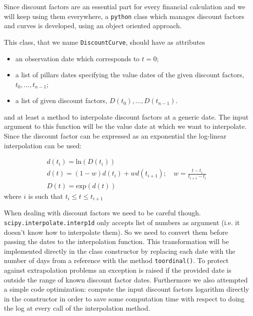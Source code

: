 \begin{finmarkets}
Since discount factors are an essential part for every financial calculation and we will keep using them everywhere, a \texttt{python} class which manages discount factors and curves is developed, using an object oriented approach.

This class, that we name \texttt{DiscountCurve}, should have as attributes
\begin{itemize}
	\tightlist
    \item an observation date which corresponds to $t=0$;
	\item a list of pillars dates specifying the value dates of the given discount factors, $t_0,...,t_{n-1}$;
	\item a list of given discount factors, $D(t_0),...,D(t_{n-1})$.
\end{itemize}

and at least a method to interpolate discount factors at a generic date. The input argument to this function will be the value date at which we want to interpolate. Since the discount factor can be expressed as an exponential the log-linear interpolation can be used:

\begin{equation}
	\begin{gathered}
		d(t_i)=\mathrm{ln}(D(t_i))\\
		d(t) = (1-w)d(t_i) + wd(t_{i+1});\quad w=\frac{t-t_i}{t_{i+1}-t_i}\\
		D(t) = \mathrm{exp}(d(t))
	\end{gathered}
\end{equation}
where $i$ is such that $t_i \le t \le t_{i+1}$

When dealing with discount factors we need to be careful though. \texttt{scipy.interpolate.interp1d} only accepts list of numbers as argument (i.e. it doesn't know how to interpolate them). So we need to convert them before passing the dates to the interpolation function. This transformation will be implemented directly in the class constructor by replacing each date with the number of days from a reference with the method \texttt{toordinal()}.
To protect against extrapolation problems an exception is raised if the provided date is outside the range of known discount factor dates.
Furthermore we also attempted a simple code optimization: compute the input discount factors logarithm directly in the constructor in order to save some computation time with respect to doing the log at every call of the interpolation method. 
\end{finmarkets}

